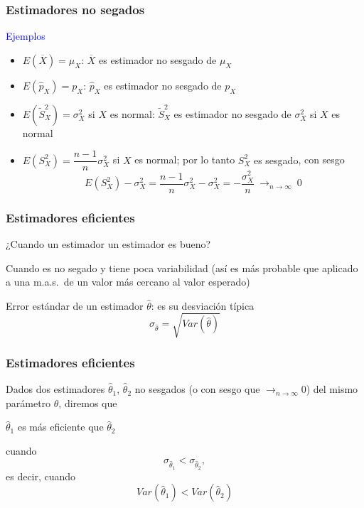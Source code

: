 \documentclass[12pt,t]{beamer}\usepackage[]{graphicx}\usepackage[]{color}
\newcommand{\blue}[1]{\textcolor{blue}{#1}}
\renewcommand{\emph}[1]{{\color{red}#1}}
\def\tendeix{{\displaystyle\mathop{\longrightarrow}_{\scriptscriptstyle
n\to\infty}}}
\theoremstyle{plain}
\theoremstyle{definition}
\begin{document}
\begin{frame}
\frametitle{Estimadores no segados}


\blue{Ejemplos}

\begin{itemize}
\item $E(\overline{X})=\mu_X$: $\overline{X}$ es estimador no sesgado de $\mu_X$
\medskip

\item $E(\widehat{p}_X)=p_X$: $\widehat{p}_X$ es estimador no sesgado de $p_X$
\medskip

\item $E(\widetilde{S}_{X}^2)=\sigma_X^2$ si $X$ es normal: $\widetilde{S}_{X}^2$ es estimador no sesgado de $\sigma_X^2$ si  $X$ es normal
\medskip

\item $E({S}_{X}^2)=\dfrac{n-1}{n}\sigma_X^2$ si $X$ es normal; por lo tanto 
\emph{${S}_{X}^2$ es sesgado}, con sesgo
$$
E({S}_{X}^2)-\sigma_X^2=\dfrac{n-1}{n}\sigma_X^2-\sigma_X^2=-\dfrac{\sigma_X^2}{n}\ \tendeix\ 0
$$

\end{itemize}

\end{frame}


\begin{frame}
\frametitle{Estimadores eficientes}

¿Cuando un estimador  un estimador es \emph{bueno}?
\medskip

Cuando es no segado y tiene poca variabilidad  (así es más probable que aplicado a una m.a.s.\ de un valor más cercano al valor esperado)
\medskip

\emph{Error estándar de un estimador $\widehat{\theta}$}:  es su desviación típica
$$\sigma_{\widehat{\theta}}=\sqrt{Var(\widehat{\theta})}$$
\medskip

\end{frame}


\begin{frame}
\frametitle{Estimadores eficientes}

Dados dos estimadores $\widehat{\theta}_1$, $\widehat{\theta}_2$ no sesgados (o con sesgo  que $\tendeix 0$) del mismo parámetro  $\theta$, diremos que 
\begin{center}
$\widehat{\theta}_1$ es \emph{más eficiente} que $\widehat{\theta}_2$
\end{center}
 cuando $$\sigma_{\widehat{\theta}_1}< \sigma_{\widehat{\theta}_2},$$  es decir, cuando $$Var(\widehat{\theta}_1)< Var(\widehat{\theta}_2)$$


\end{frame}
\end{document}

